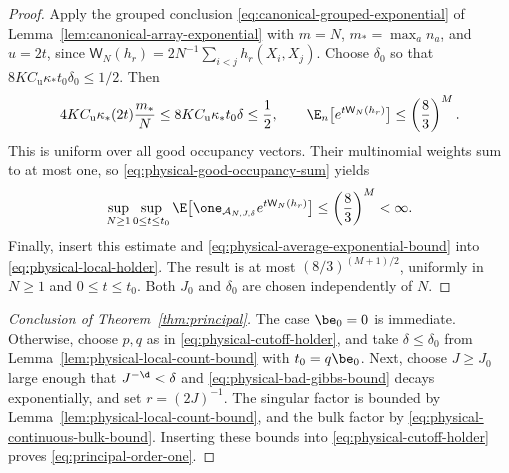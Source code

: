 \begin{proof}
Apply the grouped conclusion \eqref{eq:canonical-grouped-exponential} of Lemma~\ref{lem:canonical-array-exponential} with $m=N$, $m_*=\max_a n_a$, and $u=2t$, since $\mathsf W_N(h_r)=2N^{-1}\sum_{i<j}h_r(X_i,X_j)$.  Choose $\delta_0$ so that $8K C_{\mathrm u}\kappa_*t_0\delta_0\le1/2$.  Then
\begin{equation}
 4K C_{\mathrm u}\kappa_*(2t)\frac{m_*}{N}
 \le8K C_{\mathrm u}\kappa_*t_0\delta\le\frac12,
 \qquad
 \E_n\big[e^{t\mathsf W_N(h_r)}\big]\le\left(\frac83\right)^M.
 \label{eq:physical-local-effective-coupling}
\end{equation}
This is uniform over all good occupancy vectors.  Their multinomial weights sum to at most one, so \eqref{eq:physical-good-occupancy-sum} yields
\begin{equation}
 \sup_{N\ge1}\sup_{0\le t\le t_0}
 \E\big[\one_{\mathcal A_{N,J,\delta}}e^{t\mathsf W_N(h_r)}\big]
 \le\left(\frac83\right)^M<\infty.
 \label{eq:physical-centered-local-bound}
\end{equation}
Finally, insert this estimate and \eqref{eq:physical-average-exponential-bound} into \eqref{eq:physical-local-holder}.  The result is at most $(8/3)^{(M+1)/2}$, uniformly in $N\ge1$ and $0\le t\le t_0$.  Both $J_0$ and $\delta_0$ are chosen independently of $N$.
\end{proof}

\begin{proof}[Conclusion of Theorem~\ref{thm:principal}]
The case $\be_0=0$ is immediate.  Otherwise, choose $p,q$ as in \eqref{eq:physical-cutoff-holder}, and take $\delta\le\delta_0$ from Lemma~\ref{lem:physical-local-count-bound} with $t_0=q\be_0$.  Next, choose $J\ge J_0$ large enough that $J^{-\d}<\delta$ and \eqref{eq:physical-bad-gibbs-bound} decays exponentially, and set $r=(2J)^{-1}$.  The singular factor is bounded by Lemma~\ref{lem:physical-local-count-bound}, and the bulk factor by \eqref{eq:physical-continuous-bulk-bound}.  Inserting these bounds into \eqref{eq:physical-cutoff-holder} proves \eqref{eq:principal-order-one}.
\end{proof}
